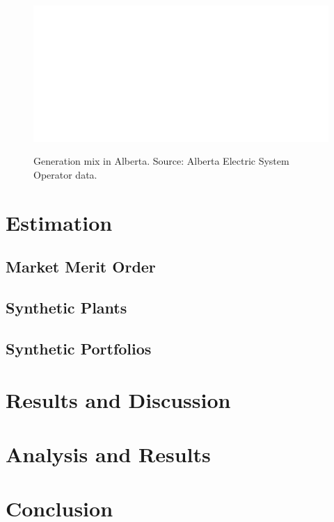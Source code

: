 \documentclass[12pt]{article}
\begin{document}
\begin{figure}[!h]%
	\centering \vspace{-.25cm} \includegraphics[width=6.5in]{../images/gen_fuel.png}
\label{fig:gen_mix}
\vspace{-0.75cm}	\caption{Generation mix in Alberta.  Source: Alberta Electric System Operator data.}
\end{figure}



\section{Estimation}

\subsection{Market Merit Order}


\subsection{Synthetic Plants}



\subsection{Synthetic Portfolios}




\section{Results and Discussion}




\section{Analysis and Results}

\section{Conclusion}




\end{document}
